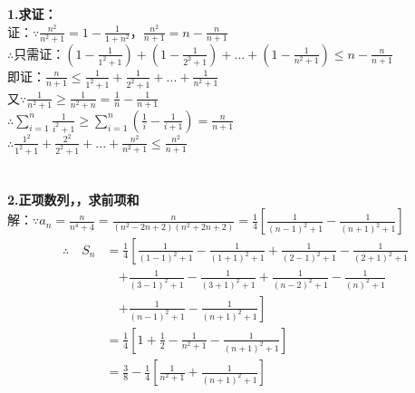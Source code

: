 \documentclass{article}
\begin{document}
 
    \noindent \Large \textbf{1.求证：} \\
    证：$\because\frac{n^{2}}{n^{2}+1}=1-\frac{1}{1+n^{2}}$，$\frac{n^{2}}{n+1}=n-\frac{n}{n+1}$ \\
    $\therefore $\quad 只需证：$\left( 1-\frac{1}{1^2+1}\right) +\left( 1-\frac{1}{2^2+1}\right) +...+\left( 1-\frac{1}{n^2+1}\right) \leqslant n-\frac{n}{n+1}$ \\
    \hspace*{0.75cm} 即证：$\frac{n}{n+1}\leqslant \frac{1}{1^2+1}+\frac{1}{2^2+1}+...+\frac{1}{n^2+1}$ \\
    又$\because\frac{1}{n^{2}+1}\geqslant \frac{1}{n^{2}+n}=\frac{1}{n}-\frac{1}{n+1} $ \\
    $\therefore $\quad $\sum_{i = 1}^{n}  \frac{1}{i^{2}+1}\geqslant \sum_{i=1}^{n}\left(\frac{1}{i}-\frac{1}{i+1}\right) =\frac{n}{n+1}$ \\
    $\therefore $\quad $\frac{1^{2}}{1^{2}+1}+\frac{2^{2}}{2^{2}+1}+...+\frac{n^{2}}{n^{2}+1}\leqslant \frac{n^{2}}{n+1}$ \\
    \\\\

    \noindent\textbf{2.正项数列{}，，求前项和} \\
    解：$\because a_n=\frac{n}{n^4+4}=\frac{n}{\left(n^2-2n+2\right)\left(n^2+2n+2\right)}=\frac{1}{4}\left[\frac{1}{\left(n-1\right)^2+1}-\frac{1}{\left(n+1\right)^2+1}\right]$ \\
        \begin{equation}
        \begin{aligned}
            \therefore \quad S_n & =  \frac{1}{4}\left[\frac{1}{\left(1-1\right)^2+1}-\frac{1}{\left(1+1\right)^2+1}+\frac{1}{\left(2-1\right)^2+1}-\frac{1}{\left(2+1\right)^2+1}\right. \\
            & \quad \left. +\frac{1}{\left(3-1\right)^2+1}-\frac{1}{\left(3+1\right)^2+1}+\frac{1}{\left(n-2\right)^2+1}-\frac{1}{\left(n\right)^2+1}\right. \\
            \phantom{=\;\;}
            & \quad \left. +\frac{1}{\left(n-1\right)^2+1}-\frac{1}{\left(n+1\right)^2+1}\right] \\
            & =\frac{1}{4}\left[1+\frac{1}{2}-\frac{1}{n^2+1}-\frac{1}{\left(n+1\right)^2+1}\right] \\
            & = \frac{3}{8}-\frac{1}{4}\left[\frac{1}{n^2+1}+\frac{1}{\left(n+1\right)^2+1}\right]
            \nonumber
        \end{aligned}
        \end{equation} 
\end{document}
